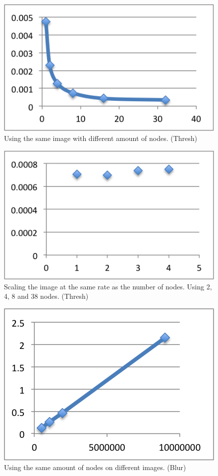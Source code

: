 \documentclass[a4paper]{article}
\begin{document}
\begin{figure}[h]
  \centering
  \includegraphics{image.png}
  \caption{Using the same image with different amount of nodes. (Thresh)}
  \label{fig:fig2}
\end{figure}

\begin{figure}[h]
  \centering
  \includegraphics{scale.png}
  \caption{Scaling the image at the same rate as the number of nodes. Using 2, 4, 8 and 38 nodes. (Thresh)}
  \label{fig:fig3}
\end{figure}

\begin{figure}[h]
  \centering
  \includegraphics{processorBlur.png}
  \caption{Using the same amount of nodes on different images. (Blur)}
  \label{fig:fig4}
\end{figure}
\end{document}
